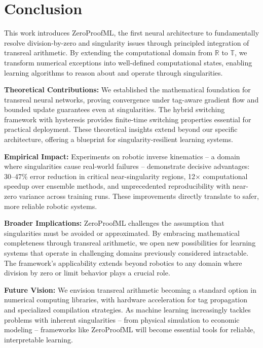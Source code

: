 \documentclass[twoside,11pt]{article}
\newcommand{\TR}{\mathbb{T}}
\newcommand{\RR}{\mathbb{R}}
\begin{document}
\section{Conclusion}

This work introduces ZeroProofML, the first neural architecture to fundamentally resolve division-by-zero and singularity issues through principled integration of transreal arithmetic. By extending the computational domain from $\RR$ to $\TR$, we transform numerical exceptions into well-defined computational states, enabling learning algorithms to reason about and operate through singularities.

\textbf{Theoretical Contributions:} We established the mathematical foundation for transreal neural networks, proving convergence under tag-aware gradient flow and bounded update guarantees even at singularities. The hybrid switching framework with hysteresis provides finite-time switching properties essential for practical deployment. These theoretical insights extend beyond our specific architecture, offering a blueprint for singularity-resilient learning systems.

\textbf{Empirical Impact:} Experiments on robotic inverse kinematics -- a domain where singularities cause real-world failures -- demonstrate decisive advantages: 30--47\% error reduction in critical near-singularity regions, 12$\times$ computational speedup over ensemble methods, and unprecedented reproducibility with near-zero variance across training runs. These improvements directly translate to safer, more reliable robotic systems.

\textbf{Broader Implications:} ZeroProofML challenges the assumption that singularities must be avoided or approximated. By embracing mathematical completeness through transreal arithmetic, we open new possibilities for learning systems that operate in challenging domains previously considered intractable. The framework's applicability extends beyond robotics to any domain where division by zero or limit behavior plays a crucial role.

\textbf{Future Vision:} We envision transreal arithmetic becoming a standard option in numerical computing libraries, with hardware acceleration for tag propagation and specialized compilation strategies. As machine learning increasingly tackles problems with inherent singularities -- from physical simulation to economic modeling -- frameworks like ZeroProofML will become essential tools for reliable, interpretable learning.
\end{document}
